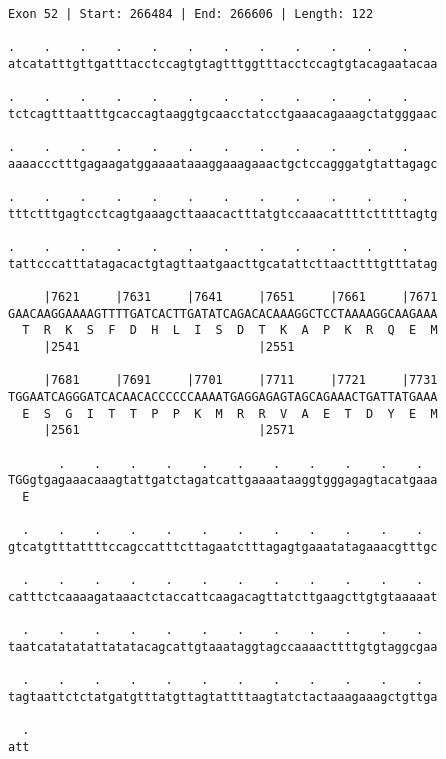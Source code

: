 \documentclass{article}
\begin{document}
\newpage
\begin{Verbatim}[fontfamily=courier]
Exon 52 | Start: 266484 | End: 266606 | Length: 122

.    .    .    .    .    .    .    .    .    .    .    .    
atcatatttgttgatttacctccagtgtagtttggtttacctccagtgtacagaatacaa

.    .    .    .    .    .    .    .    .    .    .    .    
tctcagtttaatttgcaccagtaaggtgcaacctatcctgaaacagaaagctatgggaac

.    .    .    .    .    .    .    .    .    .    .    .    
aaaaccctttgagaagatggaaaataaaggaaagaaactgctccagggatgtattagagc

.    .    .    .    .    .    .    .    .    .    .    .    
tttctttgagtcctcagtgaaagcttaaacactttatgtccaaacattttctttttagtg

.    .    .    .    .    .    .    .    .    .    .    .    
tattcccatttatagacactgtagttaatgaacttgcatattcttaacttttgtttatag

     |7621     |7631     |7641     |7651     |7661     |7671
GAACAAGGAAAAGTTTTGATCACTTGATATCAGACACAAAGGCTCCTAAAAGGCAAGAAA
  T  R  K  S  F  D  H  L  I  S  D  T  K  A  P  K  R  Q  E  M
     |2541                         |2551                    

     |7681     |7691     |7701     |7711     |7721     |7731
TGGAATCAGGGATCACAACACCCCCCAAAATGAGGAGAGTAGCAGAAACTGATTATGAAA
  E  S  G  I  T  T  P  P  K  M  R  R  V  A  E  T  D  Y  E  M
     |2561                         |2571                    

       .    .    .    .    .    .    .    .    .    .    .  
TGGgtgagaaacaaagtattgatctagatcattgaaaataaggtgggagagtacatgaaa
  E                                                         

  .    .    .    .    .    .    .    .    .    .    .    .  
gtcatgtttattttccagccatttcttagaatctttagagtgaaatatagaaacgtttgc

  .    .    .    .    .    .    .    .    .    .    .    .  
catttctcaaaagataaactctaccattcaagacagttatcttgaagcttgtgtaaaaat

  .    .    .    .    .    .    .    .    .    .    .    .  
taatcatatatattatatacagcattgtaaataggtagccaaaacttttgtgtaggcgaa

  .    .    .    .    .    .    .    .    .    .    .    .  
tagtaattctctatgatgtttatgttagtattttaagtatctactaaagaaagctgttga

  .
att
\end{Verbatim}
\newpage
\end{document}
